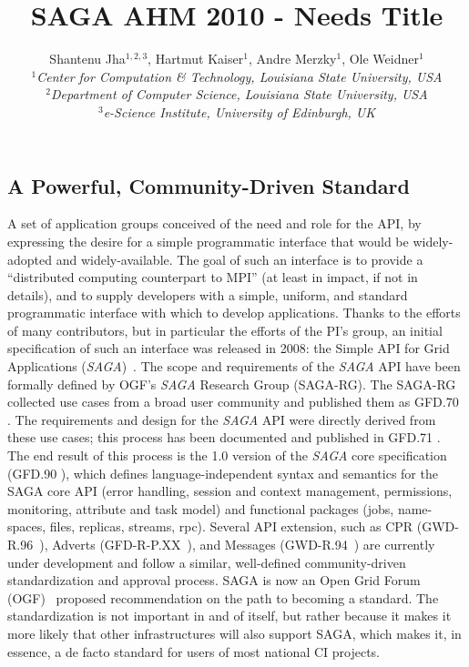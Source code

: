 \documentclass[a4paper,10pt]{article}
\newcommand{\sagaspec}{\textit{SAGA}\xspace}
\newcommand{\spec}{\sagaspec}
\begin{document}
 \title{  \vspace{-3.5em}	SAGA AHM 2010 - Needs Title}
 
 \author{Shantenu Jha$^{1,2,3}$, Hartmut Kaiser$^{1}$, Andre Merzky$^{1}$, Ole Weidner$^{1}$ \\
   \small{\emph{$^{1}$Center for Computation \& Technology, Louisiana State University, USA}}\\
   \small{\emph{$^{2}$Department of Computer Science, Louisiana State University, USA}}\\
   \small{\emph{$^{3}$e-Science Institute, University of Edinburgh, UK}}
 }
 \date{}
 \maketitle
 

\subsection*{A Powerful, Community-Driven Standard}
A set of application groups conceived of the need and role for the
API, by expressing the desire for a simple programmatic interface that
would be widely-adopted and widely-available.  The goal of such an
interface is to provide a ``distributed computing counterpart to MPI''
(at least in impact, if not in details), and to supply developers with
a simple, uniform, and standard programmatic interface with which to
develop applications.  Thanks to the efforts of many contributors, but
in particular the efforts of the PI's group, an initial specification
of such an interface was released in 2008: the Simple API for Grid
Applications (\spec)~\cite{ogf-gfd-90}. The scope and requirements of
the \spec API have been formally defined by OGF's \spec Research Group
(SAGA-RG).  The SAGA-RG collected use cases from a broad user
community and published them as GFD.70 \cite{ogf-gfd-70}. The
requirements and design for the \spec API were directly derived from
these use cases; this process has been documented and published in
GFD.71 \cite{ogf-gfd-71}. The end result of this process is the 1.0
version of the \spec core specification (GFD.90 \cite{ogf-gfd-90}),
which defines language-independent syntax and semantics for the SAGA
core API (error handling, session and context management, permissions,
monitoring, attribute and task model) and functional packages (jobs,
name-spaces, files, replicas, streams, rpc). Several API extension,
such as CPR (GWD-R.96~\cite{ogf-gwd-r-96}), Adverts
(GFD-R-P.XX~\cite{ogf-gwd-r-p-xx}), and Messages
(GWD-R.94~\cite{ogf-gwd-r-94}) are currently under development and
follow a similar, well-defined community-driven standardization and
approval process. SAGA is now an Open Grid Forum (OGF)~\cite{ogf}
proposed recommendation on the path to becoming a standard.  The
standardization is not important in and of itself, but rather because
it makes it more likely that other infrastructures will also support
SAGA, which makes it, in essence, a de facto standard for users of
most national CI projects.
\end{document}
